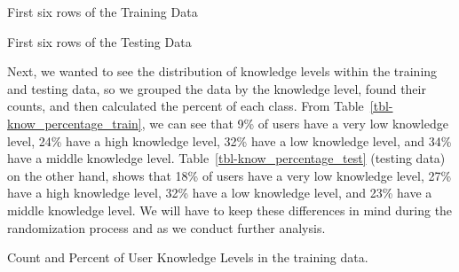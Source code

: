 \documentclass[
  letterpaper,
  DIV=11,
  numbers=noendperiod]{scrartcl}
\begin{document}
\begin{table}

\caption{\label{tbl-knowledge_train_data}First six rows of the Training
Data}


\end{table}%

\begin{table}

\caption{\label{tbl-knowledge_test_data}First six rows of the Testing
Data}


\end{table}%

Next, we wanted to see the distribution of knowledge levels within the
training and testing data, so we grouped the data by the knowledge
level, found their counts, and then calculated the percent of each
class. From Table~\ref{tbl-know_percentage_train}, we can see that 9\%
of users have a very low knowledge level, 24\% have a high knowledge
level, 32\% have a low knowledge level, and 34\% have a middle knowledge
level. Table~\ref{tbl-know_percentage_test} (testing data) on the other
hand, shows that 18\% of users have a very low knowledge level, 27\%
have a high knowledge level, 32\% have a low knowledge level, and 23\%
have a middle knowledge level. We will have to keep these differences in
mind during the randomization process and as we conduct further
analysis.

\begin{table}

\caption{\label{tbl-know_percentage_train}Count and Percent of User
Knowledge Levels in the training data.}


\end{table}%
\end{document}
